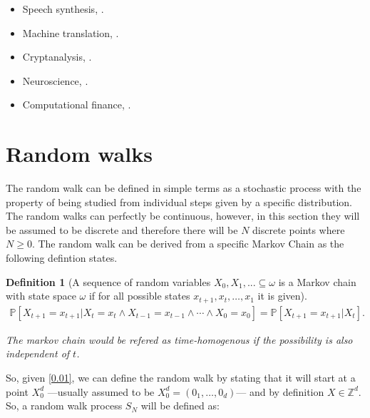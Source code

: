 \documentclass[12pt]{article}
\newtheorem{definition}{Definition}[section]
\numberwithin{equation}{section}
\begin{document}
\begin{itemize}
    \item Speech synthesis, \cite{tokuda2013speech}.
    \item Machine translation, \cite{morwal2012named}.
    \item Cryptanalysis, \cite{karlof2003hidden}.
    \item Neuroscience, \cite{florian2011hidden}.
    \item Computational finance, \cite{mamon2007hidden}.
\end{itemize}





\section{Random walks}
The random walk can be defined in simple terms as a stochastic process with the property of being studied from individual steps given by a specific distribution. The random walks can perfectly be continuous, however, in this section they will be assumed to be discrete and therefore there will be $N$ discrete points where $N \geq 0$. The random walk can be derived from a specific Markov Chain as the following defintion states. 

\begin{definition}[{A sequence of random variables $X_0, X_1, ... \subseteq \omega$ is a Markov chain with state space $\omega$ if for all possible states $x_{t+1}, x_t, \dots, x_1$} it is given]
    \begin{equation} \label{0.01}
        \begin{split}
        \mathbb{P}[X_{t+1} = x_{t+1} | X_t = x_t \land X_{t-1} = x_{t-1} \land \cdots \land X_0 = x_0] = \mathbb{P}[X_{t+1} = x_{t+1} | X_t].
    \end{split}
    \end{equation}

The markov chain would be refered as time-homogenous if the possibility is also independent of $t$. 
\end{definition}

So, given \ref{0.01}, we can define the random walk 
 by stating that it will start at a point $X_0^d$ ---usually assumed to be $X_0^d = (0_1, \dots, 0_d)$--- and by definition $X \in \mathbb{Z}^d$. So, a random walk process $S_N$ will be defined as: 
\end{document}

